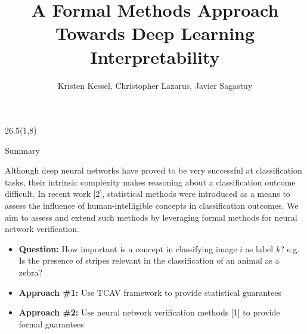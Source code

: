 \documentclass[final]{beamer}
\title{A Formal Methods Approach Towards Deep Learning Interpretability}
\author{Kristen Kessel, Christopher Lazarus, Javier Sagastuy}
\institute{Stanford University}
\begin{document}
\newcommand{\vltbl}{{\color{tbllinecolor}\vrule}}


\begin{frame}[fragile]{}

%

\newcommand{\vstart}{58} %
\newcommand{\vstartCols}{8} %
\newcommand{\fullwidth}{81}  %
\newcommand{\colwidth}{26.5}

\newcommand{\firstcolpos}{1}
\newcommand{\secondcolpos}{28.75}
\newcommand{\thirdcolpos}{56.5}
\newcommand{\bottomblockstart}{108.5}


\newenvironment{paddedBlock}[2][0.95\linewidth]
    {\begin{block}{#2}\begin{minipage}{#1}}
    {\end{minipage}\end{block}}


\begin{textblock}{\colwidth}(\firstcolpos,\vstartCols)

\begin{paddedBlock}{Summary}
Although deep neural networks have proved to be very successful at classification tasks, their intrinsic complexity makes reasoning about a classification outcome difficult.
In recent work [2], statistical methods were introduced as a means to assess the influence of human-intelligible concepts in classification outcomes.
We aim to assess and extend such methods by leveraging formal methods for neural network verification.
\begin{itemize}
\item \textbf{Question:} How important is a concept in classifying image $i$ as label $k$? e.g. Is the presence of stripes relevant in the classification of an animal as a zebra?
\item \textbf{Approach \#1:} Use TCAV framework to provide statistical guarantees
\item \textbf{Approach \#2:} Use neural network verification methods [1] to provide formal guarantees
\end{itemize}
\end{paddedBlock}


\end{textblock}
\end{frame}
\end{document}
